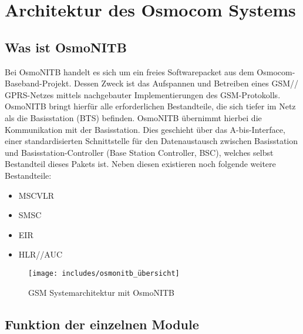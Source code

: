 \section{Architektur des Osmocom Systems}


\subsection{Was ist OsmoNITB}
Bei OsmoNITB handelt es sich um ein freies Softwarepacket aus dem Osmocom-Baseband-Projekt. Dessen Zweck ist das Aufspannen und Betreiben eines GSM// GPRS-Netzes mittels nachgebauter Implementierungen des GSM-Protokolls. OsmoNITB bringt hierfür alle erforderlichen Bestandteile, die sich tiefer im Netz als die Basisstation (BTS) befinden. OsmoNITB übernimmt hierbei die Kommunikation mit der Basisstation. Dies geschieht über das A-bis-Interface, einer standardisierten Schnittstelle für den Datenaustausch zwischen Basisstation und Basisstation-Controller (Base Station Controller, BSC), welches selbst Bestandteil dieses Pakets ist. Neben diesen existieren noch folgende weitere Bestandteile:




\begin{itemize}
\item MSC\/VLR\\
\item SMSC\\
\item EIR\\
\item HLR//AUC\\
\end{itemize}



\begin{figure}[htbp]
    \centering
    \texttt{[image: includes/osmonitb\_übersicht]}
    \caption{GSM Systemarchitektur mit OsmoNITB}
	\label{fig:osmonitb}
\end{figure}






\subsection{Funktion der einzelnen Module}




